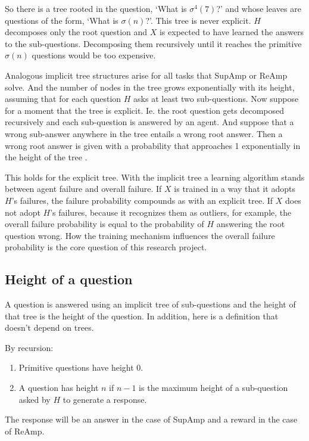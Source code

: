 \documentclass{farlamp}
\begin{document}
So there is a tree rooted in the question, ‘What is $\sigma^4(7)$?’ and whose
leaves are questions of the form, ‘What is $\sigma(n)$?’. This tree is never
explicit. $H$ decomposes only the root question and $X$ is expected to have
learned the answers to the sub-questions. Decomposing them recursively until it
reaches the primitive $\sigma(n)$ questions would be too expensive.

Analogous implicit tree structures arise for all tasks that SupAmp or ReAmp
solve. And the number of nodes in the tree grows exponentially with its height,
assuming that for each question $H$ asks at least two sub-questions.
Now suppose for a moment that the tree is explicit. Ie. the root question gets
decomposed recursively and each sub-question is answered by an agent. And
suppose that a wrong sub-answer anywhere in the tree entails a wrong root
answer. Then a wrong root answer is given with a probability that approaches 1
exponentially in the height of the tree \parencite{ChriRelAmp}.

This holds for the explicit tree. With the implicit tree a learning algorithm
stands between agent failure and overall failure. If $X$ is trained in a way
that it adopts $H$'s failures, the failure probability compounds as with an
explicit tree. If $X$ does not adopt $H$'s failures, because it recognizes them
as outliers, for example, the overall failure probability is equal to the
probability of $H$ answering the root question wrong.
How the training mechanism influences the overall failure probability is the
core question of this research project.


\subsection{Height of a question}

A question is answered using an implicit tree of sub-questions and the height of
that tree is the height of the question. In addition, here is a definition that
doesn't depend on trees.

\begin{definition} By recursion:
    \begin{enumerate}
    \item Primitive questions have height 0.
    \item A question has height $n$ if $n-1$ is the maximum height of a
        sub-question asked by $H$ to generate a response.
    \end{enumerate}
The response will be an answer in the case of SupAmp and a reward in the case of
ReAmp.
\end{definition}
\end{document}
